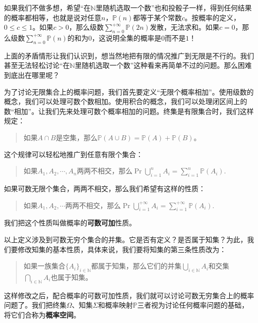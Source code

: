 \documentclass[12pt,UTF8,fontset=none]{ctexbook}
\begin{document}
如果我们不做多想，希望“在$\mathbb{N}$里随机选取一个数”也和投骰子一样，得到任何结果的概率都相等，也就是说对任意$n$，$\mathbb{P}(n)$都等于某个常数$c$。按概率的定义，$0\leqslant c\leqslant 1$。如果$c>0$，那么级数$\sum_{n=0}^{+\infty} \mathbb{P}(2n)$发散，无法求和。如果$c=0$，那么级数$\sum_{n=0}^{+\infty} \mathbb{P}(n)$的和为$0$，这说明全集的概率是$0$而不是$1$！

上面的矛盾情形让我们认识到，想当然地把有限的情况推广到无限是不行的。我们甚至无法轻松讨论“在$\mathbb{N}$里随机选取一个数”这种看来再简单不过的问题。那么困难到底出在哪里呢？

为了讨论无限集合上的概率问题，我们首先要定义“无限个概率相加”。使用级数的概念，我们可以处理可数个数相加。使用积合的概念，我们可以处理闭区间上的数“相加”。让我们先来处理可数个概率相加的问题。终集是有限集合时，我们这样规定：
\begin{quotation}
    如果$A\cap B$是空集，那么$\mathbb{P}(A\cup B) = \mathbb{P}(A) + \mathbb{P}(B)$。
\end{quotation}
这个规律可以轻松地推广到任意有限个集合：
\begin{quotation}
    \noindent 如果$A_1,A_2, \cdots, A_n$两两不相交，那么$\displaystyle\Pr{\bigcup_{i=1}^n A_i} = \sum_{i=1}^n \mathbb{P}(A_i).$
\end{quotation}
如果可数无限个集合，两两不相交，那么我们希望有这样的性质：
\begin{quotation}
    \noindent 如果$A_1,A_2, \cdots$两两不相交，那么$\displaystyle\Pr{\bigcup_{i=1}^{+\infty} A_i} = \sum_{i=1}^{+\infty} \mathbb{P}(A_i).$
\end{quotation}
我们把这个性质叫做概率的\textbf{可数可加}性质。

以上定义涉及到可数无穷个集合的并集。它是否有定义？是否属于知集？为此，我们要修改知集的基本性质，具体来说，我们要将知集的第三条性质改为：
\begin{quotation}
    \noindent 如果一族集合$\{A_i\}_{i\in\mathbb{N}}$都属于知集，那么它们的并集$\bigcup_{i\in\mathbb{N}} A_i$和交集$\bigcap_{i\in\mathbb{N}} A_i$也属于知集。
\end{quotation}
这样修改之后，配合概率的可数可加性质，我们就可以讨论可数无穷集合上的概率问题了。我们把终集$\Omega$、知集$\Sigma$和概率映射$\mathbb{P}$三者视为讨论任何概率问题的基础，将它们合称为\textbf{概率空间}。
\end{document}
